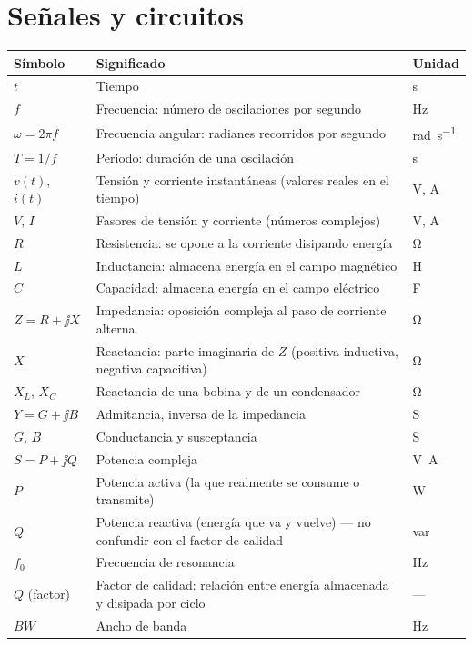 \section*{Señales y circuitos}
\begin{longtable}{@{}>{\centering\arraybackslash}p{2.6cm}p{9.6cm}p{2.4cm}@{}}
\toprule \textbf{Símbolo} & \textbf{Significado} & \textbf{Unidad}\\ \midrule\endhead
$t$ & Tiempo & \si{\second} \\
$f$ & Frecuencia: número de oscilaciones por segundo & \si{\hertz} \\
$\omega = 2\pi f$ & Frecuencia angular: radianes recorridos por segundo & \si{\radian\per\second} \\
$T = 1/f$ & Periodo: duración de una oscilación & \si{\second} \\
$v(t)$, $i(t)$ & Tensión y corriente instantáneas (valores reales en el tiempo) & \si{\volt}, \si{\ampere} \\
$V$, $I$ & Fasores de tensión y corriente (números complejos) & \si{\volt}, \si{\ampere} \\
$R$ & Resistencia: se opone a la corriente disipando energía & \si{\ohm} \\
$L$ & Inductancia: almacena energía en el campo magnético & \si{\henry} \\
$C$ & Capacidad: almacena energía en el campo eléctrico & \si{\farad} \\
$Z = R + \jj X$ & Impedancia: oposición compleja al paso de corriente alterna & \si{\ohm} \\
$X$ & Reactancia: parte imaginaria de $Z$ (positiva inductiva, negativa capacitiva) & \si{\ohm} \\
$X_L$, $X_C$ & Reactancia de una bobina y de un condensador & \si{\ohm} \\
$Y = G + \jj B$ & Admitancia, inversa de la impedancia & \si{\siemens} \\
$G$, $B$ & Conductancia y susceptancia & \si{\siemens} \\
$S = P + \jj Q$ & Potencia compleja & \si{\volt\ampere} \\
$P$ & Potencia activa (la que realmente se consume o transmite) & \si{\watt} \\
$Q$ & Potencia reactiva (energía que va y vuelve) — no confundir con el factor de calidad & var \\
$f_0$ & Frecuencia de resonancia & \si{\hertz} \\
$Q$ (factor) & Factor de calidad: relación entre energía almacenada y disipada por ciclo & --- \\
$BW$ & Ancho de banda & \si{\hertz} \\
\bottomrule
\end{longtable}

